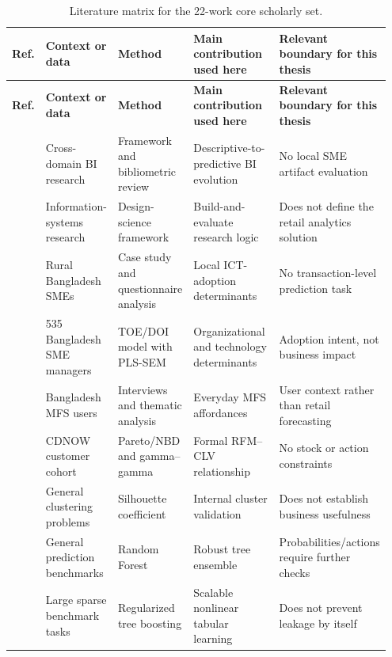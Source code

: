 \begin{landscape}
\tiny
\setlength{\tabcolsep}{2pt}
\renewcommand{\arraystretch}{0.88}
\begin{longtable}{|p{0.05\linewidth}|p{0.17\linewidth}|p{0.19\linewidth}|p{0.26\linewidth}|p{0.28\linewidth}|}
\caption{Literature matrix for the 22-work core scholarly set.}
\label{tab:literature_matrix}\\
\hline
\textbf{Ref.} & \textbf{Context or data} & \textbf{Method} & \textbf{Main contribution used here} & \textbf{Relevant boundary for this thesis} \\
\hline
\endfirsthead
\hline
\textbf{Ref.} & \textbf{Context or data} & \textbf{Method} & \textbf{Main contribution used here} & \textbf{Relevant boundary for this thesis} \\
\hline
\endhead
\cite{chen2012business} & Cross-domain BI research & Framework and bibliometric review & Descriptive-to-predictive BI evolution & No local SME artifact evaluation \\
\cite{hevner2004design} & Information-systems research & Design-science framework & Build-and-evaluate research logic & Does not define the retail analytics solution \\
\cite{hoque2016ict} & Rural Bangladesh SMEs & Case study and questionnaire analysis & Local ICT-adoption determinants & No transaction-level prediction task \\
\cite{shahadat2023digital} & 535 Bangladesh SME managers & TOE/DOI model with PLS-SEM & Organizational and technology determinants & Adoption intent, not business impact \\
\cite{hazra2021mfs} & Bangladesh MFS users & Interviews and thematic analysis & Everyday MFS affordances & User context rather than retail forecasting \\
\cite{fader2005rfm} & CDNOW customer cohort & Pareto/NBD and gamma--gamma & Formal RFM--CLV relationship & No stock or action constraints \\
\cite{rousseeuw1987silhouettes} & General clustering problems & Silhouette coefficient & Internal cluster validation & Does not establish business usefulness \\
\cite{breiman2001rf} & General prediction benchmarks & Random Forest & Robust tree ensemble & Probabilities/actions require further checks \\
\cite{chen2016xgboost} & Large sparse benchmark tasks & Regularized tree boosting & Scalable nonlinear tabular learning & Does not prevent leakage by itself \\

\end{longtable}
\end{landscape}

